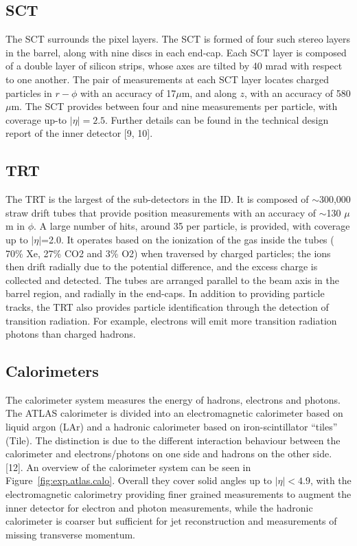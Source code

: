 \subsection*{SCT}

The SCT surrounds the pixel layers.
The SCT is formed of four such stereo layers in the barrel,
along with nine discs in each end-cap. 
Each SCT layer is composed of a double layer of silicon
strips, whose axes are tilted by 40 mrad with respect to one another. The pair of measurements at
each SCT layer locates charged particles in $r - \phi$ with an accuracy of 17$\mu$m, 
and along $z$, with an accuracy of 580 $\mu$m.
The SCT provides between four and nine measurements per particle, with
coverage up-to $|\eta|=2.5$.
Further details can be found in the technical design report of the inner
detector [9, 10].


\subsection*{TRT}

The TRT is the largest of the sub-detectors in the ID.
It is composed of  $\sim$300,000 straw drift tubes 
that provide position measurements with an accuracy of $\sim$130 $\mu$m in $\phi$.
A large number of hits, around 35 per particle, is provided, with coverage up to
$|\eta|$=2.0. 
It operates based on the ionization of the gas inside the tubes ( 70\% Xe, 27\% CO2 and 3\% O2) 
when traversed by charged particles; the ions then drift radially due to
the potential difference, and the excess charge is collected and detected. 
The tubes are arranged parallel to the beam axis in the barrel region, and radially in the end-caps. 
In addition to providing particle tracks, 
the TRT also provides particle identification through
the detection of transition radiation. For example, 
electrons will emit more transition radiation photons than charged hadrons.


\subsection{Calorimeters}


The calorimeter system measures the energy of hadrons, electrons and photons.
The ATLAS calorimeter is divided into an electromagnetic calorimeter based on liquid argon (LAr)
and a hadronic calorimeter based on  iron-scintillator ``tiles'' (Tile).
The distinction is due to the
different interaction behaviour between the calorimeter and electrons/photons on one side and hadrons on the other side. 
 [12].
An overview of the calorimeter system can be seen in Figure~\ref{fig:exp.atlas.calo}. 
Overall they cover solid angles up to $|\eta| < 4.9$, with the electromagnetic calorimetry providing finer 
grained measurements to augment the inner detector for electron and photon measurements, while
the hadronic calorimeter is coarser but sufficient for jet reconstruction and measurements
of missing transverse momentum.

